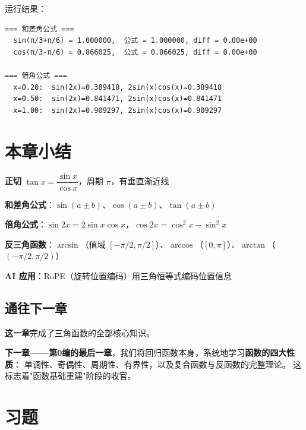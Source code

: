 运行结果：
\begin{lstlisting}[frame=none,backgroundcolor={},numbers=none]
=== 和差角公式 ===
  sin(π/3+π/6) = 1.000000,  公式 = 1.000000, diff = 0.00e+00
  cos(π/3-π/6) = 0.866025,  公式 = 0.866025, diff = 0.00e+00

=== 倍角公式 ===
  x=0.20:  sin(2x)=0.389418, 2sin(x)cos(x)=0.389418
  x=0.50:  sin(2x)=0.841471, 2sin(x)cos(x)=0.841471
  x=1.00:  sin(2x)=0.909297, 2sin(x)cos(x)=0.909297
\end{lstlisting}


\section{本章小结}

\begin{progressbox}
\textbf{正切} \(\tan x = \dfrac{\sin x}{\cos x}\)，周期 \(\pi\)，有垂直渐近线

\textbf{和差角公式}：\(\sin(a\pm b)\)、\(\cos(a\pm b)\)、\(\tan(a\pm b)\)

\textbf{倍角公式}：\(\sin 2x = 2\sin x \cos x\)，\(\cos 2x = \cos^2 x - \sin^2 x\)

\textbf{反三角函数}：\(\arcsin\)（值域 \([-\pi/2,\pi/2]\)）、\(\arccos\)（\([0,\pi]\)）、\(\arctan\)（\((-\pi/2,\pi/2)\)）

\textbf{AI 应用}：RoPE（旋转位置编码）用三角恒等式编码位置信息
\end{progressbox}

\subsection*{通往下一章}

\textbf{这一章}完成了三角函数的全部核心知识。

\textbf{下一章——第0编的最后一章}，我们将回归函数本身，系统地学习\textbf{函数的四大性质}：
单调性、奇偶性、周期性、有界性，以及复合函数与反函数的完整理论。
这标志着"函数基础重建"阶段的收官。


\section{习题}


